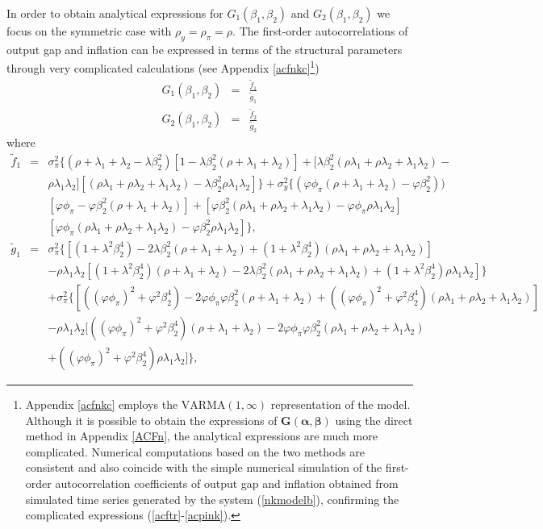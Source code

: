 In order to obtain analytical expressions for $G_{1}(\beta_1,\beta_2)$ and $G_{2}(\beta_1,\beta_2)$ we focus on the symmetric case with $\rho_y=\rho_{\pi}=\rho.$
The first-order autocorrelations of output gap and inflation can be expressed in terms of the structural parameters through very complicated calculations (see Appendix \ref{acfnkc}\footnote{Appendix \ref{acfnkc} employs the $\mbox{VARMA}(1,\infty)$ representation of the model. Although it is possible to obtain the expressions of $\pmb G(\pmb\alpha,\pmb\beta)$ using the direct method in Appendix \ref{ACFn}, the analytical expressions are much more complicated. Numerical computations  based on the two methods are consistent and also coincide with the simple numerical simulation of the first-order autocorrelation coefficients of output gap and inflation obtained from simulated time series generated by the system (\ref{nkmodelb}), confirming the complicated expressions (\ref{acftr}-\ref{acpink}).})
\begin{eqnarray}\label{acftr}
G_{1}(\beta_1,\beta_2) &=&\frac{\widetilde{f}_1}{\widetilde{g}_1}\label{acynk}\\
G_{2}(\beta_1,\beta_2)
&=&\frac{\widetilde{f}_2}{\widetilde{g}_2}\label{acpink}
\end{eqnarray}
where
\begin{eqnarray}
\widetilde{f}_1&=&\sigma_{\pi}^2\Big\{(\rho+\lambda_1+\lambda_2-\lambda\beta_2^2)[1-\lambda\beta_2^2(\rho+\lambda_1+\lambda_2)]+[\lambda\beta_2^2(\rho\lambda_1+\rho\lambda_2+\lambda_1\lambda_2)-\nonumber\\
&&\rho\lambda_1\lambda_2][(\rho\lambda_1+\rho\lambda_2+\lambda_1\lambda_2)-\lambda\beta_2^2\rho\lambda_1\lambda_2]\Big\}+\sigma_y^2\Big\{(\varphi\phi_\pi(\rho+\lambda_1+\lambda_2)-\varphi\beta_2^2))\nonumber\\
&&[\varphi\phi_\pi-\varphi\beta_2^2(\rho+\lambda_1+\lambda_2)]+[\varphi\beta_2^2(\rho\lambda_1+\rho\lambda_2+\lambda_1\lambda_2)-\varphi\phi_\pi\rho\lambda_1\lambda_2]\nonumber\\
&&[\varphi\phi_\pi(\rho\lambda_1+\rho\lambda_2+\lambda_1\lambda_2)-\varphi\beta_2^2\rho\lambda_1\lambda_2]\Big\},\nonumber\\
\widetilde{g}_1&=&\sigma_{\pi}^2\Big\{[(1+\lambda^2\beta_2^4)-2\lambda\beta_2^2(\rho+\lambda_1+\lambda_2)+(1+\lambda^2\beta_2^4)(\rho\lambda_1+\rho\lambda_2+\lambda_1\lambda_2)]\nonumber\\
&&-\rho\lambda_1\lambda_2[(1+\lambda^2\beta_2^4)(\rho+\lambda_1+\lambda_2)-2\lambda\beta_2^2(\rho\lambda_1+\rho\lambda_2+\lambda_1\lambda_2)+(1+\lambda^2\beta_2^4)\rho\lambda_1\lambda_2]\Big\}\nonumber\\
&&+\sigma_{\pi}^2\Big\{[((\varphi\phi_\pi)^2+\varphi^2\beta_2^4)-2\varphi\phi_\pi\varphi\beta_2^2(\rho+\lambda_1+\lambda_2)+((\varphi\phi_\pi)^2+\varphi^2\beta_2^4)(\rho\lambda_1+\rho\lambda_2+\lambda_1\lambda_2)]\nonumber\\
&&-\rho\lambda_1\lambda_2[((\varphi\phi_\pi)^2+\varphi^2\beta_2^4)(\rho+\lambda_1+\lambda_2)-2\varphi\phi_\pi\varphi\beta_2^2(\rho\lambda_1+\rho\lambda_2+\lambda_1\lambda_2)\nonumber\\
&&+((\varphi\phi_\pi)^2+\varphi^2\beta_2^4)\rho\lambda_1\lambda_2]\Big\},\label{gyvar}
\end{eqnarray}
